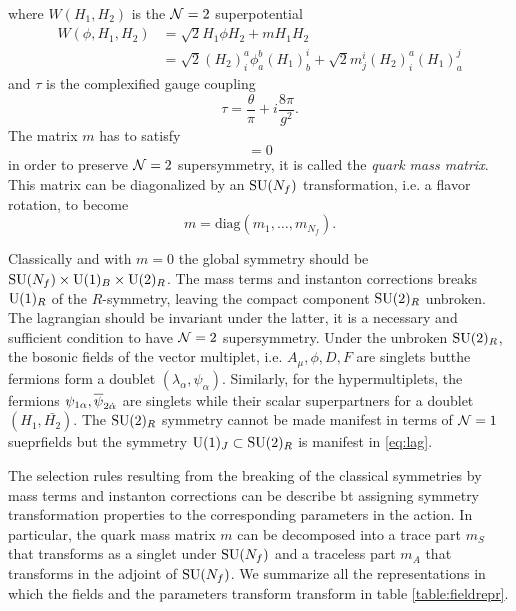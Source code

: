     where $W(H_1,H_2)$ is the $\mathcal{N}=2$ superpotential
    \begin{align}
        W(\phi,H_1,H_2) &= \sqrt{2}H_1\phi H_2 + mH_1H_2 \\
        &= \sqrt{2}(H_2)^a_i\phi^b_a (H_1)^i_b + \sqrt{2}m^i_j(H_2)^a_i(H_1)^j_a
    \end{align}
    and $\tau$ is the complexified gauge coupling
    \begin{equation}
        \tau=\frac{\theta}{\pi}+i\frac{8\pi}{g^2}.
    \end{equation}
    The matrix $m$ has to satisfy
    \begin{equation}
        [m,m^\dagger]=0
    \end{equation}
    in order to preserve $\mathcal{N}=2$ supersymmetry, it is called the \emph{quark mass matrix}. This matrix can be diagonalized by an $\text{SU}(N_f)$ transformation, i.e. a flavor rotation, to become
    \begin{equation}
        m=\text{diag}(m_1,\dots,m_{N_f}).
    \end{equation}

    Classically and with $m=0$ the global symmetry should be $\text{SU}(N_f)\times\text{U}(1)_B\times\text{U}(2)_R$. The mass terms and instanton corrections breaks $\text{U}(1)_R$ of the $R$-symmetry, leaving the compact component $\text{SU}(2)_R$ unbroken. The lagrangian should be invariant under the latter, it is a necessary and sufficient condition to have $\mathcal{N}=2$ supersymmetry. Under the unbroken $\text{SU}(2)_R$, the bosonic fields of the vector multiplet, i.e. $A_\mu,\phi,D,F$ are singlets butthe fermions form a doublet $(\lambda_\alpha,\psi_\alpha)$. Similarly, for the hypermultiplets, the fermions $\psi_{1\alpha},\overline{\psi}_{2\dot{\alpha}}$ are singlets while their scalar superpartners for a doublet $(H_1,\bar{H_2})$. The $\text{SU}(2)_R$ symmetry cannot be made manifest in terms of $\mathcal{N}=1$ sueprfields but the symmetry $\text{U}(1)_J\subset\text{SU}(2)_R$ is manifest in \eqref{eq:lag}.
    
    The selection rules resulting from the breaking of the classical symmetries by mass terms and instanton corrections can be describe bt assigning symmetry transformation properties to the corresponding parameters in the action. In particular, the quark mass matrix $m$ can be decomposed into a trace part $m_S$ that transforms as a singlet under $\text{SU}(N_f)$ and a traceless part $m_A$ that transforms in the adjoint of $\text{SU}(N_f)$. We summarize all the representations in which the fields and the parameters transform transform in table \ref{table:fieldrepr}.

